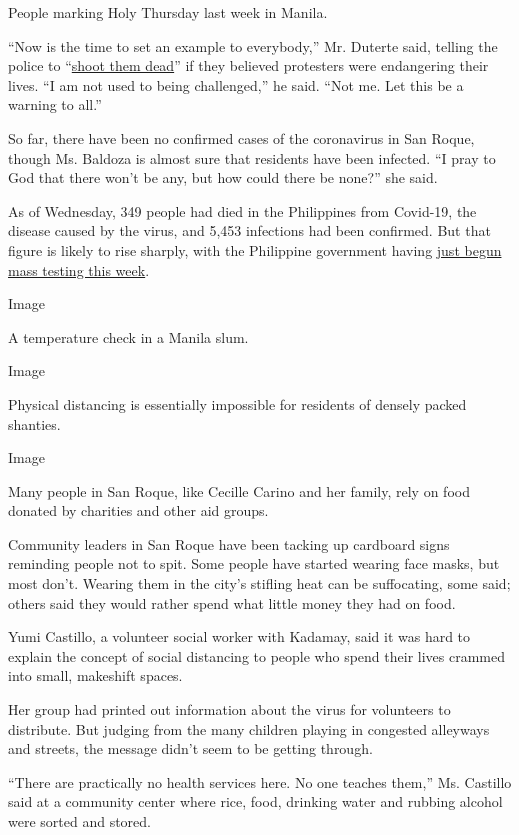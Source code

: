People marking Holy Thursday last week in Manila.

``Now is the time to set an example to everybody,'' Mr. Duterte said,
telling the police to
``\href{https://www.nytimes3xbfgragh.onion/reuters/2020/04/02/world/asia/02reuters-health-coronavirus-philippines-duterte.html?searchResultPosition=6}{shoot
them dead}'' if they believed protesters were endangering their lives.
``I am not used to being challenged,'' he said. ``Not me. Let this be a
warning to all.''

So far, there have been no confirmed cases of the coronavirus in San
Roque, though Ms. Baldoza is almost sure that residents have been
infected. ``I pray to God that there won't be any, but how could there
be none?'' she said.

As of Wednesday, 349 people had died in the Philippines from Covid-19,
the disease caused by the virus, and 5,453 infections had been
confirmed. But that figure is likely to rise sharply, with the
Philippine government having
\href{https://www.nytimes3xbfgragh.onion/reuters/2020/04/14/world/asia/14reuters-health-coronavirus-philippines.html?searchResultPosition=21}{just
begun mass testing this week}.

Image

A temperature check in a Manila slum.

Image

Physical distancing is essentially impossible for residents of densely
packed shanties.

Image

Many people in San Roque, like Cecille Carino and her family, rely on
food donated by charities and other aid groups.

Community leaders in San Roque have been tacking up cardboard signs
reminding people not to spit. Some people have started wearing face
masks, but most don't. Wearing them in the city's stifling heat can be
suffocating, some said; others said they would rather spend what little
money they had on food.

Yumi Castillo, a volunteer social worker with Kadamay, said it was hard
to explain the concept of social distancing to people who spend their
lives crammed into small, makeshift spaces.

Her group had printed out information about the virus for volunteers to
distribute. But judging from the many children playing in congested
alleyways and streets, the message didn't seem to be getting through.

``There are practically no health services here. No one teaches them,''
Ms. Castillo said at a community center where rice, food, drinking water
and rubbing alcohol were sorted and stored.

